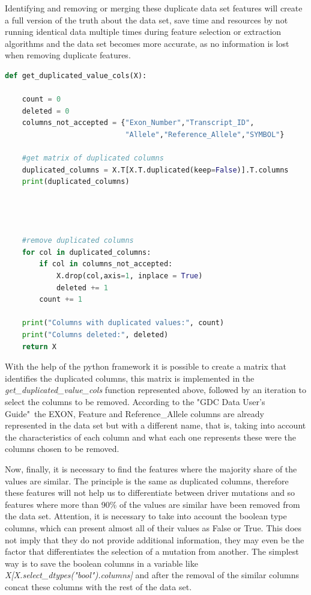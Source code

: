Identifying and removing or merging these duplicate data set features will create a full version of the truth about the data set, save time and resources by not running identical data multiple times during feature selection or extraction algorithms and the data set becomes more accurate, as no information is lost when removing duplicate features.

\begin{lstlisting}[language=Python]
def get_duplicated_value_cols(X):
    
    count = 0
    deleted = 0
    columns_not_accepted = {"Exon_Number","Transcript_ID",
                            "Allele","Reference_Allele","SYMBOL"}
    
    #get matrix of duplicated columns
    duplicated_columns = X.T[X.T.duplicated(keep=False)].T.columns
    print(duplicated_columns)
    
    
    
    
    #remove duplicated columns
    for col in duplicated_columns:
        if col in columns_not_accepted: 
            X.drop(col,axis=1, inplace = True)
            deleted += 1
        count += 1
        
    print("Columns with duplicated values:", count)
    print("Columns deleted:", deleted)
    return X
\end{lstlisting}

With the help of the python framework it is possible to create a matrix that identifies the duplicated columns, this matrix is implemented in the \textit{get\_duplicated\_value\_cols} function represented above, followed by an iteration to select the columns to be removed. According to the "GDC Data User's Guide"\ the EXON, Feature and Reference\_Allele columns are already represented in the data set but with a different name, that is, taking into account the characteristics of each column and what each one represents these were the columns chosen to be removed.

Now, finally, it is necessary to find the features where the majority share of the values are similar. The principle is the same as duplicated columns, therefore these features will not help us to differentiate between driver mutations and so features where more than 90\% of the values are similar have been removed from the data set. Attention, it is necessary to take into account the boolean type columns, which can present almost all of their values as False or True. This does not imply that they do not provide additional information, they may even be the factor that differentiates the selection of a mutation from another. The simplest way is to save the boolean columns in a variable like \emph{X[X.select\_dtypes("bool").columns]} and after the removal of the similar columns concat these columns with the rest of the data set.


